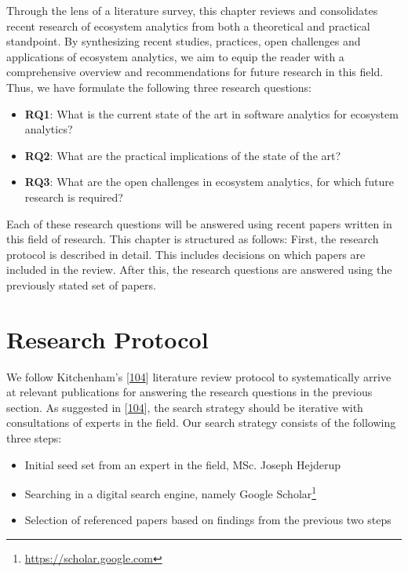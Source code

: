 \documentclass[]{book}
\providecommand{\tightlist}{%
  \setlength{\itemsep}{0pt}\setlength{\parskip}{0pt}}
\let\rmarkdownfootnote\footnote%
\def\footnote{\protect\rmarkdownfootnote}
\begin{document}
Through the lens of a literature survey, this chapter reviews and
consolidates recent research of ecosystem analytics from both a
theoretical and practical standpoint. By synthesizing recent studies,
practices, open challenges and applications of ecosystem analytics, we
aim to equip the reader with a comprehensive overview and
recommendations for future research in this field. Thus, we have
formulate the following three research questions:

\begin{itemize}
\tightlist
\item
  \textbf{RQ1}: What is the current state of the art in software
  analytics for ecosystem analytics?
\item
  \textbf{RQ2}: What are the practical implications of the state of the
  art?
\item
  \textbf{RQ3}: What are the open challenges in ecosystem analytics, for
  which future research is required?
\end{itemize}

Each of these research questions will be answered using recent papers
written in this field of research. This chapter is structured as
follows: First, the research protocol is described in detail. This
includes decisions on which papers are included in the review. After
this, the research questions are answered using the previously stated
set of papers.

\section{Research Protocol}\label{research-protocol-2}

We follow Kitchenham's
{[}\protect\hyperlink{ref-kitchenham2004procedures}{104}{]} literature
review protocol to systematically arrive at relevant publications for
answering the research questions in the previous section. As suggested
in {[}\protect\hyperlink{ref-kitchenham2004procedures}{104}{]}, the
search strategy should be iterative with consultations of experts in the
field. Our search strategy consists of the following three steps:

\begin{itemize}
\tightlist
\item
  Initial seed set from an expert in the field, MSc. Joseph Hejderup
\item
  Searching in a digital search engine, namely Google Scholar\footnote{\url{https://scholar.google.com}}
\item
  Selection of referenced papers based on findings from the previous two
  steps
\end{itemize}
\end{document}

